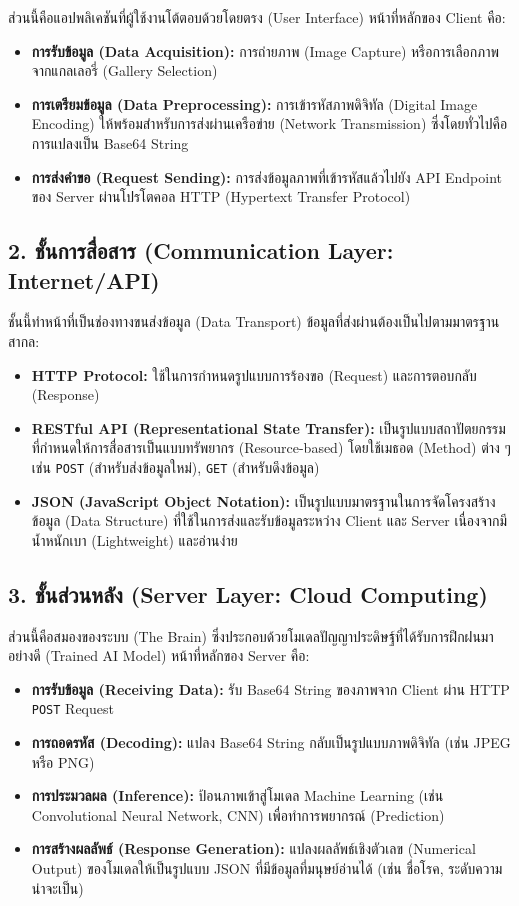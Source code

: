 \documentclass[11pt,a4paper,openany]{report}
\begin{document}
ส่วนนี้คือแอปพลิเคชันที่ผู้ใช้งานโต้ตอบด้วยโดยตรง (User Interface) หน้าที่หลักของ Client คือ:
\begin{itemize}
  \item \textbf{การรับข้อมูล (Data Acquisition):} การถ่ายภาพ (Image Capture) หรือการเลือกภาพจากแกลเลอรี่ (Gallery Selection)
  \item \textbf{การเตรียมข้อมูล (Data Preprocessing):} การเข้ารหัสภาพดิจิทัล (Digital Image Encoding) ให้พร้อมสำหรับการส่งผ่านเครือข่าย (Network Transmission) ซึ่งโดยทั่วไปคือการแปลงเป็น Base64 String
  \item \textbf{การส่งคำขอ (Request Sending):} การส่งข้อมูลภาพที่เข้ารหัสแล้วไปยัง API Endpoint ของ Server ผ่านโปรโตคอล HTTP (Hypertext Transfer Protocol)
\end{itemize}


\subsection{2. ชั้นการสื่อสาร (Communication Layer: Internet/API)}

ชั้นนี้ทำหน้าที่เป็นช่องทางขนส่งข้อมูล (Data Transport) ข้อมูลที่ส่งผ่านต้องเป็นไปตามมาตรฐานสากล:
\begin{itemize}
  \item \textbf{HTTP Protocol:} ใช้ในการกำหนดรูปแบบการร้องขอ (Request) และการตอบกลับ (Response)
  \item \textbf{RESTful API (Representational State Transfer):} เป็นรูปแบบสถาปัตยกรรมที่กำหนดให้การสื่อสารเป็นแบบทรัพยากร (Resource-based) โดยใช้เมธอด (Method) ต่าง ๆ เช่น \texttt{POST} (สำหรับส่งข้อมูลใหม่), \texttt{GET} (สำหรับดึงข้อมูล)
  \item \textbf{JSON (JavaScript Object Notation):} เป็นรูปแบบมาตรฐานในการจัดโครงสร้างข้อมูล (Data Structure) ที่ใช้ในการส่งและรับข้อมูลระหว่าง Client และ Server เนื่องจากมีน้ำหนักเบา (Lightweight) และอ่านง่าย
\end{itemize}


\subsection{3. ชั้นส่วนหลัง (Server Layer: Cloud Computing)}

ส่วนนี้คือสมองของระบบ (The Brain) ซึ่งประกอบด้วยโมเดลปัญญาประดิษฐ์ที่ได้รับการฝึกฝนมาอย่างดี (Trained AI Model) หน้าที่หลักของ Server คือ:
\begin{itemize}
  \item \textbf{การรับข้อมูล (Receiving Data):} รับ Base64 String ของภาพจาก Client ผ่าน HTTP \texttt{POST} Request
  \item \textbf{การถอดรหัส (Decoding):} แปลง Base64 String กลับเป็นรูปแบบภาพดิจิทัล (เช่น JPEG หรือ PNG)
  \item \textbf{การประมวลผล (Inference):} ป้อนภาพเข้าสู่โมเดล Machine Learning (เช่น Convolutional Neural Network, CNN) เพื่อทำการพยากรณ์ (Prediction)
  \item \textbf{การสร้างผลลัพธ์ (Response Generation):} แปลงผลลัพธ์เชิงตัวเลข (Numerical Output) ของโมเดลให้เป็นรูปแบบ JSON ที่มีข้อมูลที่มนุษย์อ่านได้ (เช่น ชื่อโรค, ระดับความน่าจะเป็น)
\end{itemize}
\end{document}
